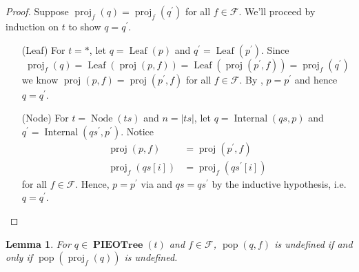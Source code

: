 \documentclass{amsart}
\DeclareMathOperator{\pop}{\mathrm{pop}}
\DeclareMathOperator{\proj}{\mathrm{proj}}
\DeclareMathOperator{\PIEOTree}{\mathbf{PIEOTree}}
\DeclareMathOperator{\Leaf}{\mathrm{Leaf}}
\DeclareMathOperator{\Internal}{\mathrm{Internal}}
\DeclareMathOperator{\Node}{\mathrm{Node}}
\newtheorem{lem}[thm]{Lemma}
\theoremstyle{definition}
\begin{document}
\begin{proof}
    Suppose $\proj_f(q) = \proj_f(q^\prime)$ for all $f \in \mathcal F$.
    We'll proceed by induction on $t$ to show $q = q^\prime$.
    \begin{itemize}
        \item[(Leaf)] For $t = \ast$, let $q = \Leaf(p)$ and $q^\prime = \Leaf(p^\prime)$.
            Since $$\proj_f(q) = \Leaf(\proj(p, f)) = \Leaf(\proj(p^\prime, f)) = \proj_f(q^\prime)$$
            we know $\proj(p, f) = \proj(p^\prime, f)$ for all $f \in \mathcal F$.
            By , $p = p^\prime$ and hence $q = q^\prime$.

        \item[(Node)] For $t = \Node(ts)$ and $n = |ts|$, let $q = \Internal(qs, p)$ and $q^\prime = \Internal(qs^\prime, p^{\prime})$.
            Notice
            \begin{align*}
                \proj(p, f) &= \proj(p^\prime, f)\\
                \proj_f(qs[i]) &= \proj_f(qs^\prime[i]) \tag{$i = 1,\ldots, n$}
            \end{align*}
            for all $f \in \mathcal F$. 
            Hence, $p = p^\prime$ via  and $qs = qs^\prime$ by the inductive hypothesis, i.e. $q = q^\prime$.
    \end{itemize}
\end{proof}

\begin{lem}
    \label{lem:pop_undef}
    For $q \in \PIEOTree(t)$ and $f \in \mathcal F$, $\pop(q, f)$ is undefined if and only if $\pop(\proj_f(q))$ is undefined.
\end{lem}
\end{document}
